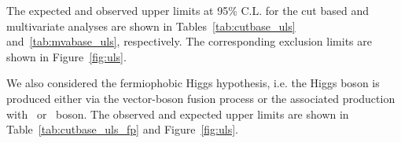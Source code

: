 The expected and observed upper limits at 95\% C.L. for the cut based and
multivariate analyses are shown in Tables~\ref{tab:cutbase_uls}
and~\ref{tab:mvabase_uls}, respectively. The corresponding exclusion
limits are shown in Figure~\ref{fig:uls}.

We also considered the fermiophobic Higgs hypothesis, i.e. the Higgs
boson is produced either via the vector-boson fusion process or the
associated production with \W\ or \Z\ boson. The observed and expected
upper limits are shown in Table~\ref{tab:cutbase_uls_fp} and
Figure~\ref{fig:uls}.

\begin{figure}[!hbtp]
\centering
{}
\centering
{}

\end{figure}
